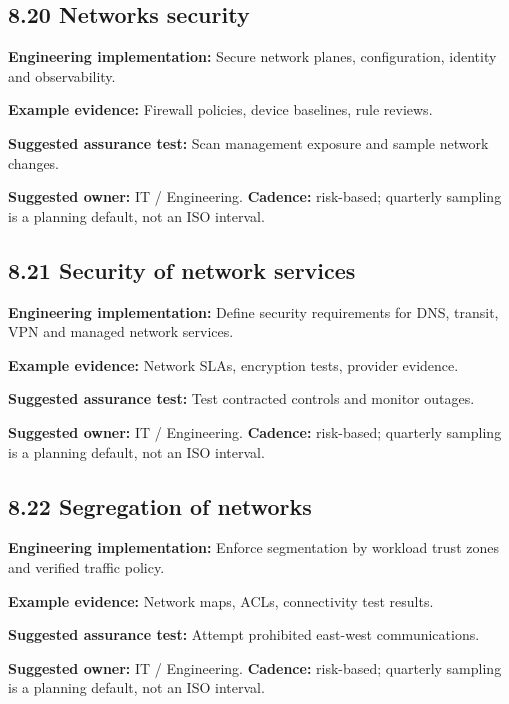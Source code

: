 \documentclass[11pt,letterpaper]{article}
\begin{document}
\subsection{8.20 Networks security}
\textbf{Engineering implementation:} Secure network planes, configuration, identity and observability.\par
\textbf{Example evidence:} Firewall policies, device baselines, rule reviews.\par
\textbf{Suggested assurance test:} Scan management exposure and sample network changes.\par
\textbf{Suggested owner:} IT / Engineering. \textbf{Cadence:} risk-based; quarterly sampling is a planning default, not an ISO interval.\par
{}
\subsection{8.21 Security of network services}
\textbf{Engineering implementation:} Define security requirements for DNS, transit, VPN and managed network services.\par
\textbf{Example evidence:} Network SLAs, encryption tests, provider evidence.\par
\textbf{Suggested assurance test:} Test contracted controls and monitor outages.\par
\textbf{Suggested owner:} IT / Engineering. \textbf{Cadence:} risk-based; quarterly sampling is a planning default, not an ISO interval.\par
{}
\subsection{8.22 Segregation of networks}
\textbf{Engineering implementation:} Enforce segmentation by workload trust zones and verified traffic policy.\par
\textbf{Example evidence:} Network maps, ACLs, connectivity test results.\par
\textbf{Suggested assurance test:} Attempt prohibited east-west communications.\par
\textbf{Suggested owner:} IT / Engineering. \textbf{Cadence:} risk-based; quarterly sampling is a planning default, not an ISO interval.\par
{}
\end{document}
